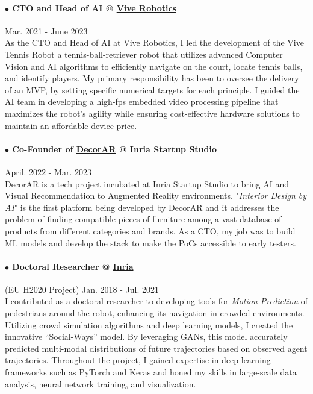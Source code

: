 \documentclass[10pt]{res}
\begin{document}
\begin{resume}
\paragraph{$\bullet$ CTO and Head of AI @ \href{http://vivetennis.com} {Vive Robotics}} \hfill Mar. 2021 - June 2023\\
As the CTO and Head of AI at Vive Robotics, I led the development of the Vive Tennis Robot a tennis-ball-retriever robot that utilizes advanced Computer Vision and AI algorithms to efficiently navigate on the court, locate tennis balls, and identify players. My primary responsibility has been to oversee the delivery of an MVP, by setting specific numerical targets for each principle. I guided the AI team in developing a high-fps embedded video processing pipeline that maximizes the robot's agility while ensuring cost-effective hardware solutions to maintain an affordable device price.
\vspace{-12pt}

\paragraph{$\bullet$ Co-Founder of \href{http://decorar.ai} {DecorAR} @ Inria Startup Studio} \hfill April. 2022 - Mar. 2023\\
DecorAR is a tech project incubated at Inria Startup Studio to bring AI and Visual Recommendation to Augmented Reality environments. "\textit{Interior Design by AI}" is the first platform being developed by DecorAR and it addresses the problem of finding compatible pieces of furniture among a vast database of products from different categories and brands. As a CTO, my job was to build ML models and develop the stack to make the PoCs accessible to early testers.
\vspace{-12pt}

\paragraph{$\bullet$ Doctoral Researcher @ \href{http://inria.fr} {Inria}} (EU H2020 Project) \hfill Jan. 2018 - Jul. 2021\\
I contributed as a doctoral researcher to developing tools for \textit{Motion Prediction} of pedestrians around the robot, enhancing its navigation in crowded environments. Utilizing crowd simulation algorithms and deep learning models, I created the innovative \enquote{Social-Ways} model. By leveraging GANs, this model accurately predicted multi-modal distributions of future trajectories based on observed agent trajectories. Throughout the project, I gained expertise in deep learning frameworks such as PyTorch and Keras and honed my skills in large-scale data analysis, neural network training, and visualization.
\vspace{-8pt}


\end{resume}
\end{document}
